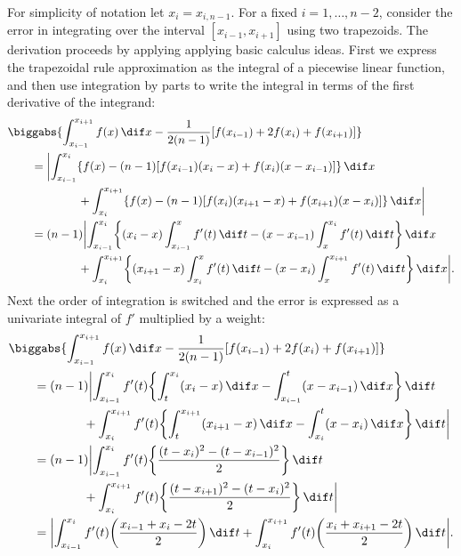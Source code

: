 \documentclass[final]{elsarticle}
\theoremstyle{definition}
\theoremstyle{remark}
\begin{document}
For simplicity of notation let $x_i=x_{i,n-1}$.  For a fixed $i=1, \ldots, n-2$, consider the error in integrating over the interval $[x_{i-1},x_{i+1}]$ using two trapezoids.  The derivation proceeds by applying applying basic calculus ideas.  First we express the trapezoidal rule approximation as the integral of a piecewise linear function, and then use integration by parts to write the integral in terms of the first derivative of the integrand:
\begin{align*}
\MoveEqLeft{\biggabs{\int_{x_{i-1}}^{x_{i+1}} f(x) \, \dif x - \frac{1}{2(n-1)} [f(x_{i-1}) + 2f(x_{i}) + f(x_{i+1}) ]}}\\
&=\biggl \lvert \int_{x_{i-1}}^{x_{i}} \{f(x) - (n-1)[f(x_{i-1})(x_{i}-x) + f(x_{i})(x-x_{i-1})] \}\, \dif x \\
&\qquad \qquad + \int_{x_{i}}^{x_{i+1}} \{ f(x) - (n-1)[f(x_{i})(x_{i+1}-x) + f(x_{i+1})(x-x_{i})] \} \, \dif x \biggr \rvert \\
&=(n-1) \biggl \lvert \int_{x_{i-1}}^{x_{i}} \biggl \{(x_{i}-x)\int_{x_{i-1}}^x f'(t) \, \dif t -    (x-x_{i-1}) \int_{x}^{x_i} f'(t) \, \dif t  \biggr \}\, \dif x \\
&\qquad \qquad + \int_{x_{i}}^{x_{i+1}} \biggl \{(x_{i+1}-x)\int_{x_{i}}^x f'(t) \, \dif t -    (x-x_{i}) \int_{x}^{x_{i+1}} f'(t) \, \dif t  \biggr \}\, \dif x \biggr \rvert.
\end{align*}
Next the order of integration is switched and the error is expressed as a univariate integral of $f'$ multiplied by a weight:
\begin{align*}
\MoveEqLeft{\biggabs{\int_{x_{i-1}}^{x_{i+1}} f(x) \, \dif x - \frac{1}{2(n-1)} [f(x_{i-1}) + 2f(x_{i}) + f(x_{i+1}) ]}}\\
&=(n-1) \biggl \lvert \int_{x_{i-1}}^{x_{i}} f'(t) \biggl\{ \int_{t}^{x_{i}} (x_{i}-x) \, \dif x  - \int_{x_{i-1}}^{t}  (x-x_{i-1}) \, \dif x \biggr \} \, \dif t \\
&\qquad \qquad + \int_{x_{i}}^{x_{i+1}} f'(t) \biggl \{\int_{t}^{x_{i+1}} (x_{i+1}-x) \, \dif x - \int_{x_i}^{t} (x-x_{i}) \, \dif x  \biggr \}\, \dif t \biggr \rvert \\
&=(n-1) \biggl \lvert \int_{x_{i-1}}^{x_{i}} f'(t) \biggl\{ \frac{(t-x_i)^2-(t-x_{i-1})^2}{2} \biggr \} \, \dif t \\
&\qquad \qquad + \int_{x_{i}}^{x_{i+1}} f'(t) \biggl\{ \frac{(t-x_{i+1})^2-(t-x_{i})^2}{2} \biggr \}\, \dif t \biggr \rvert  \\
&=\biggl \lvert \int_{x_{i-1}}^{x_{i}} f'(t) \biggl ( \frac{x_{i-1}+x_{i}-2t}{2} \biggr ) \, \dif t + \int_{x_{i}}^{x_{i+1}} f'(t) \biggl ( \frac{x_{i}+x_{i+1}-2t}{2} \biggr ) \, \dif t\biggr \rvert .
\end{align*}
\end{document}
